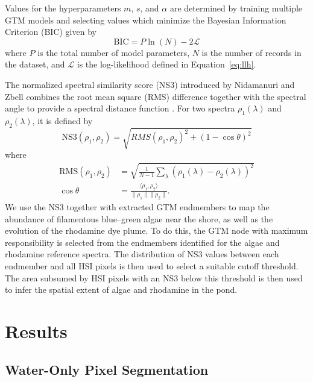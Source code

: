 Values for the hyperparameters $m$, $s$, and $\alpha$ are determined by training
multiple GTM models and selecting values which minimize the Bayesian Information
Criterion (BIC) given by
\begin{equation}
    \text{BIC} = P\ln(N) - 2\mathscr{L}
\end{equation}
where $P$ is the total number of model parameters, $N$ is the number of records
in the dataset, and $\mathscr{L}$ is the log-likelihood defined in
Equation~\eqref{eq:llh}.

The normalized spectral similarity score (NS3) introduced by Nidamanuri and
Zbell combines the root mean square (RMS) difference together with the spectral
angle to provide a spectral distance function \cite{nidamanuri2010normalized}.
For two spectra $\rho_1(\lambda)$ and $\rho_2(\lambda)$, it is defined by
\begin{equation}
    \text{NS3}(\rho_1, \rho_2) = \sqrt{RMS(\rho_1, \rho_2)^2 + (1-\cos\theta)^2}
\end{equation}
where
\begin{align}
    \text{RMS}(\rho_1, \rho_2) &= \sqrt{\frac{1}{N-1}\sum_\lambda \left(\rho_{1}(\lambda) - \rho_2(\lambda) \right)^2} \\
    \cos\theta &= \frac{\langle \rho_1 , \rho_2 \rangle}{\lVert \rho_1\rVert \lVert \rho_2 \rVert}.
\end{align}
We use the NS3 together with extracted GTM endmembers to map the abundance of
filamentous blue--green algae near the shore, as well as the evolution of the
rhodamine dye plume. To do this, the GTM node with maximum responsibility is
selected from the endmembers identified for the algae and rhodamine reference
spectra. The distribution of NS3 values between each endmember and all HSI
pixels is then used to select a suitable cutoff threshold. The area subsumed by
HSI pixels with an NS3 below this threshold is then used to infer the spatial
extent of algae and rhodamine in the pond.


\section{Results}



\subsection{Water-Only Pixel Segmentation}


